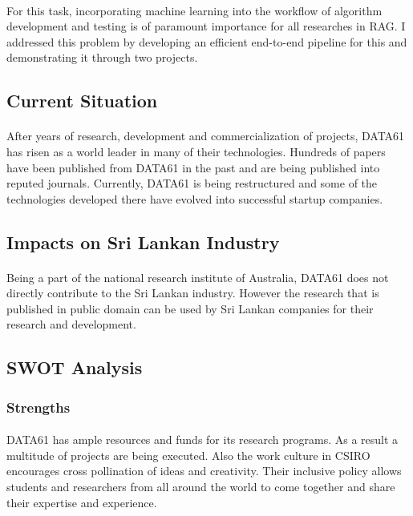 \paragraph{}
For this task, incorporating machine learning into the workflow of algorithm development and testing is of paramount importance for all researches in RAG. I addressed this problem by developing an efficient end-to-end pipeline for this and demonstrating it through two projects.


\subsection{Current Situation}
\paragraph{}
After years of research, development and commercialization of projects, DATA61 has risen as a world leader in many of their technologies. Hundreds of papers have been published from DATA61 in the past and are being published into reputed journals. Currently, DATA61 is being restructured and some of the technologies developed there have evolved into successful startup companies.

\subsection{Impacts on Sri Lankan Industry}
\paragraph{}
Being a part of the national research institute of Australia, DATA61 does not directly contribute to the Sri Lankan industry. However the research that is published in public domain can be used by Sri Lankan companies for their research and development.

\newpage
\subsection{SWOT Analysis}

\subsubsection*{Strengths}
\paragraph{}
DATA61 has ample resources and funds for its research programs. As a result a multitude of projects are being executed. Also the work culture in CSIRO encourages cross pollination of ideas and creativity. Their inclusive policy allows students and researchers from all around the world to come together and share their expertise and experience.


